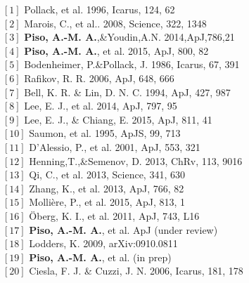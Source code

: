 \documentclass[12pt, letterpaper]{article}
\begin{document}


%

\footnotesize

\begin{multicols}{2}
\noindent 
$[1]$ Pollack, et al. 1996, Icarus, 124, 62 \\
$[2]$ Marois, C.,  et al.. 2008, Science, 322, 1348 \\
$[3]$ \textbf{Piso, A.-M. A.},\&Youdin,A.N. 2014,ApJ,786,21 \\
$[4]$ \textbf{Piso, A.-M. A.}, et al. 2015, ApJ, 800, 82 \\
$[5]$ Bodenheimer, P.\&Pollack, J. 1986, Icarus, 67, 391 \\
$[6]$ Rafikov, R. R. 2006, ApJ, 648, 666 \\
$[7]$ Bell, K. R. \& Lin, D. N. C. 1994, ApJ, 427, 987 \\
$[8]$ Lee, E. J., et al. 2014, ApJ, 797, 95 \\ 
$[9]$ Lee, E. J., \& Chiang, E. 2015, ApJ, 811, 41 \\
$[10]$ Saumon, et al. 1995, ApJS, 99, 713 \\
$[11]$ D'Alessio, P., et al. 2001, ApJ, 553, 321 \\
$[12]$ Henning,T.,\&Semenov, D. 2013, ChRv, 113, 9016 \\
$[13]$ Qi, C., et al. 2013, Science, 341, 630 \\
$[14]$ Zhang, K., et al. 2013, ApJ, 766, 82 \\
$[15]$ Molli{\`e}re, P., et al. 2015, ApJ, 813, 1 \\
$[16]$ \"Oberg, K. I., et al. 2011, ApJ, 743, L16 \\
$[17]$ \textbf{Piso, A.-M. A.}, et al. ApJ (under review) \\
$[18]$ Lodders, K. 2009, arXiv:0910.0811 \\
$[19]$ \textbf{Piso, A.-M. A.}, et al. (in prep) \\
$[20]$ Ciesla, F. J. \& Cuzzi, J. N. 2006, Icarus, 181, 178



\end{multicols}

%
%


\end{document}
